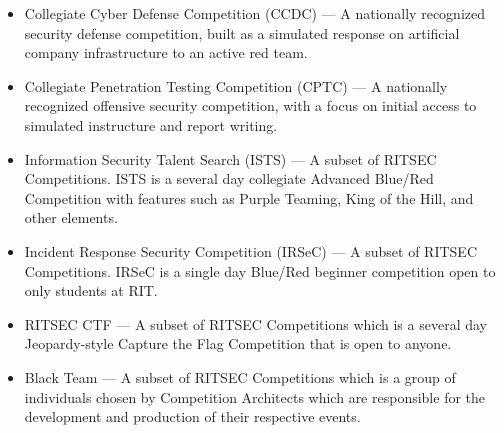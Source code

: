 \begin{itemize}
      \item Collegiate Cyber Defense Competition (CCDC) --- A nationally recognized security
            defense competition, built as a simulated response on artificial company 
            infrastructure to an active red team.

      \item Collegiate Penetration Testing Competition (CPTC) --- A nationally recognized
            offensive security competition, with a focus on initial access to simulated 
            instructure and report writing.

      \item Information Security Talent Search (ISTS) --- A subset of RITSEC Competitions.
            ISTS is a several day collegiate Advanced Blue/Red Competition with features
            such as Purple Teaming, King of the Hill, and other elements.

      \item Incident Response Security Competition (IRSeC) --- A subset of RITSEC
            Competitions. IRSeC is a single day Blue/Red beginner competition open to only
            students at RIT\@.

      \item RITSEC CTF --- A subset of RITSEC Competitions which is a several day
            Jeopardy-style Capture the Flag Competition that is open to anyone.

      \item Black Team --- A subset of RITSEC Competitions which is a group of individuals
            chosen by Competition Architects which are responsible for the development and
            production of their respective events.

\end{itemize}